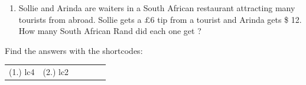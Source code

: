 \begin{enumerate}[noitemsep, label=\textbf{\arabic*}. ]
\begin{enumerate}[noitemsep, label=\textbf{\alph*}. ]
\label{m39335*uid27}\item Sollie and Arinda are waiters in a South African restaurant attracting many tourists from abroad. Sollie gets a $£6$ tip from a tourist and Arinda gets \$ 12.
How many South African Rand did each one get ?
\end{enumerate}
        \end{enumerate}
    \label{m39335*cid7}
\par {} Find the answers with the shortcodes:
 \par \begin{tabular}[h]{cccccc}
 (1.) lc4  &  (2.) lc2  & \end{tabular}
